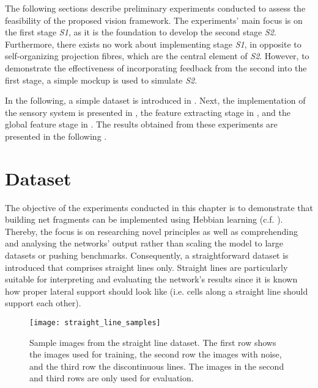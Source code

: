 The following sections describe preliminary experiments conducted to assess the feasibility of the proposed vision framework.
The experiments' main focus is on the first stage \emph{S1}, as it is the foundation to develop the second stage \emph{S2}. Furthermore, there exists no work about implementing stage \emph{S1}, in opposite to self-organizing projection fibres, which are the central element of \emph{S2}.
However, to demonstrate the effectiveness of incorporating feedback from the second into the first stage, a simple mockup is used to simulate \emph{S2}.

In the following, a simple dataset is introduced in . Next, the implementation of the sensory system is presented in , the feature extracting stage in , and the global feature stage in . The results obtained from these experiments are presented in the following .


\section{Dataset}
The objective of the experiments conducted in this chapter is to demonstrate that building net fragments can be implemented using Hebbian learning  (c.f. ).
Thereby, the focus is on researching novel principles as well as comprehending and analysing the networks' output rather than scaling the model to large datasets or pushing benchmarks.
Consequently, a straightforward dataset is introduced that comprises straight lines only.
Straight lines are particularly suitable for interpreting and evaluating the network's results since it is known how proper lateral support should look like (i.e. cells along a straight line should support each other).


\begin{figure}[h]
    \centering
    \texttt{[image: straight\_line\_samples]}
    \caption[Sample images from the dataset]{Sample images from the straight line dataset. The first row shows the images used for training, the second row the images with noise, and the third row the discontinuous lines. The images in the second and third rows are only used for evaluation.}
\end{figure}


